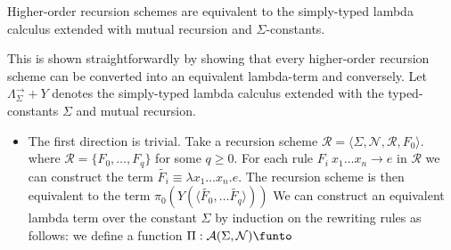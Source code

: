 
\begin{proposition}
Higher-order recursion schemes are equivalent to the simply-typed lambda calculus extended with mutual recursion and $\Sigma$-constants.
\end{proposition}
This is shown straightforwardly by showing that every higher-order recursion scheme can be converted into an equivalent lambda-term and conversely.
\newcommand\lcalculrec{\Lambda^{\rightarrow}_\Sigma+Y}
Let $\lcalculrec$ denotes the simply-typed lambda calculus extended with the typed-constants $\Sigma$ and mutual recursion.


\begin{itemize}
\item The first direction is trivial. Take a recursion scheme $\mathcal{R} = \langle \Sigma, \mathcal{N}, \mathcal{R}, F_0 \rangle$.
where $\mathcal{R} = \{ F_0, \ldots, F_q \}$ for some $q\geq 0$.
For each rule $F_i\ x_1 \ldots x_n \rightarrow e$ in $\mathcal{R}$ we can construct the term $\widetilde{F_i} \equiv \lambda x_1 \ldots x_n . e$. The recursion scheme is then equivalent to the term $\pi_0 (Y (\langle \widetilde{F_0}, \ldots \widetilde{F_q}\rangle)) $
We can construct an equivalent lambda term over the constant $\Sigma$ by induction on the rewriting rules as follows: we define a function $\Pi : \mathcal{A}(\Sigma,\mathcal{N}) \funto $

\end{itemize} 